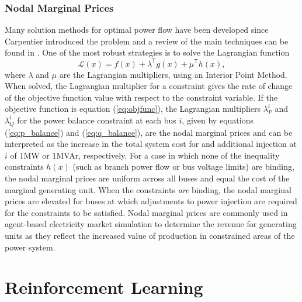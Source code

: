 \subsubsection{Nodal Marginal Prices}
Many solution methods for optimal power flow have been developed
since Carpentier introduced the problem and a review of the main techniques
can be found in .  One of the most robust
strategies is to solve the Lagrangian function
\begin{equation}
\mathcal{L}(x) = f(x) + \lambda^\mathsf{T}g(x) + \mu^\mathsf{T}h(x),
\end{equation}
where $\lambda$ and $\mu$ are the Lagrangian multipliers, using an Interior
Point Method.  When solved, the Lagrangian multiplier for a constraint gives
the rate of change of the objective function value with respect to the
constraint variable.  If the objective function is equation (\ref{eq:objfunc}), the Lagrangian
multipliers $\lambda^i_P$ and $\lambda^i_Q$ for the power balance constraint at
each bus $i$, given by equations (\ref{eq:p_balance}) and (\ref{eq:q_balance}),
are the nodal marginal prices and can be interpreted as the increase in the
total system cost for and additional injection at $i$ of 1MW or 1MVAr,
respectively.  For a case in which none of the inequality constraints $h(x)$
(such as branch power flow or bus voltage limits) are binding, the nodal
marginal prices are uniform across all buses and equal the cost of the
marginal generating unit.  When the constraints \textit{are} binding, the nodal
marginal prices are elevated for buses at which adjustments to power injection
are required for the constraints to be satisfied.  Nodal marginal prices are
commonly used in agent-based electricity market simulation to determine the
revenue for generating units as they reflect the increased value of production in
constrained areas of the power system.

\section{Reinforcement Learning}
\label{sec:rl}


